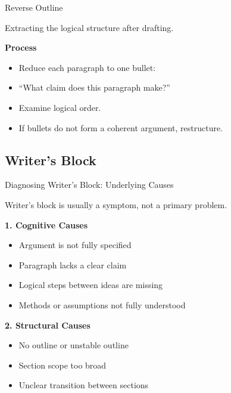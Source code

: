 \documentclass{beamer}
\begin{document}

\begin{frame}{Reverse Outline}


Extracting the logical structure after drafting.
\vspace{1em}


\textbf{Process}
\begin{itemize}
    \item Reduce each paragraph to one bullet:
    \item[] “What claim does this paragraph make?”
    \item Examine logical order.
    \item If bullets do not form a coherent argument, restructure.
\end{itemize}






\end{frame}

\subsection{Writer's Block}



\begin{frame}{Diagnosing Writer's Block: Underlying Causes}

Writer’s block is usually a symptom, not a primary problem.

\vspace{0.5em}

\textbf{1. Cognitive Causes}
\begin{itemize}
    \item Argument is not fully specified
    \item Paragraph lacks a clear claim
    \item Logical steps between ideas are missing
    \item Methods or assumptions not fully understood
\end{itemize}

\textbf{2. Structural Causes}
\begin{itemize}
    \item No outline or unstable outline
    \item Section scope too broad
    \item Unclear transition between sections
\end{itemize}


\end{frame}
\end{document}
